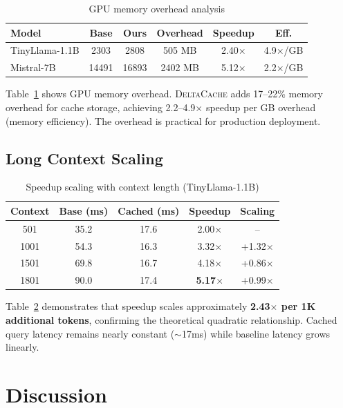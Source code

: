 \documentclass{article}
\newcommand{\deltacache}{\textsc{DeltaCache}}
\begin{document}
\begin{table}[t]
\centering
\caption{GPU memory overhead analysis}
\label{tab:memory}
\small
\begin{tabular}{lccccc}
\toprule
Model & Base & Ours & Overhead & Speedup & Eff. \\
\midrule
TinyLlama-1.1B & 2303 & 2808 & 505 MB & 2.40$\times$ & 4.9$\times$/GB \\
Mistral-7B & 14491 & 16893 & 2402 MB & 5.12$\times$ & 2.2$\times$/GB \\
\bottomrule
\end{tabular}
\end{table}

Table~\ref{tab:memory} shows GPU memory overhead.
\deltacache{} adds 17--22\% memory overhead for cache storage, achieving 2.2--4.9$\times$ speedup per GB overhead (memory efficiency).
The overhead is practical for production deployment.

\subsection{Long Context Scaling}

\begin{table}[t]
\centering
\caption{Speedup scaling with context length (TinyLlama-1.1B)}
\label{tab:longctx}
\small
\begin{tabular}{ccccc}
\toprule
Context & Base (ms) & Cached (ms) & Speedup & Scaling \\
\midrule
501 & 35.2 & 17.6 & 2.00$\times$ & -- \\
1001 & 54.3 & 16.3 & 3.32$\times$ & +1.32$\times$ \\
1501 & 69.8 & 16.7 & 4.18$\times$ & +0.86$\times$ \\
1801 & 90.0 & 17.4 & \textbf{5.17$\times$} & +0.99$\times$ \\
\bottomrule
\end{tabular}
\end{table}

Table~\ref{tab:longctx} demonstrates that speedup scales approximately \textbf{2.43$\times$ per 1K additional tokens}, confirming the theoretical quadratic relationship.
Cached query latency remains nearly constant ($\sim$17ms) while baseline latency grows linearly.

\section{Discussion}
\end{document}
